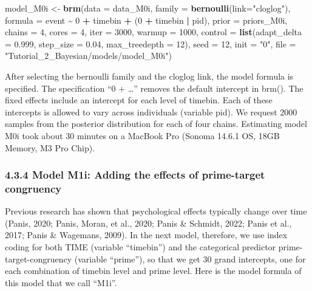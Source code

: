 \documentclass[
  man, donotrepeattitle,floatsintext]{apa6}
\newenvironment{Shaded}{\begin{snugshade}}{\end{snugshade}}
\newcommand{\AttributeTok}[1]{\textcolor[rgb]{0.13,0.29,0.53}{#1}}
\newcommand{\DecValTok}[1]{\textcolor[rgb]{0.00,0.00,0.81}{#1}}
\newcommand{\FloatTok}[1]{\textcolor[rgb]{0.00,0.00,0.81}{#1}}
\newcommand{\FunctionTok}[1]{\textcolor[rgb]{0.13,0.29,0.53}{\textbf{#1}}}
\newcommand{\NormalTok}[1]{#1}
\newcommand{\OtherTok}[1]{\textcolor[rgb]{0.56,0.35,0.01}{#1}}
\newcommand{\SpecialCharTok}[1]{\textcolor[rgb]{0.81,0.36,0.00}{\textbf{#1}}}
\newcommand{\StringTok}[1]{\textcolor[rgb]{0.31,0.60,0.02}{#1}}
\begin{document}
\begin{Shaded}
\begin{Highlighting}[]
\NormalTok{model\_M0i }\OtherTok{\textless{}{-}}                    
   \FunctionTok{brm}\NormalTok{(}\AttributeTok{data =}\NormalTok{ data\_M0i,}
       \AttributeTok{family =} \FunctionTok{bernoulli}\NormalTok{(}\AttributeTok{link=}\StringTok{"cloglog"}\NormalTok{),}
       \AttributeTok{formula =}\NormalTok{ event }\SpecialCharTok{\textasciitilde{}} \DecValTok{0} \SpecialCharTok{+}\NormalTok{ timebin }\SpecialCharTok{+}\NormalTok{ (}\DecValTok{0} \SpecialCharTok{+}\NormalTok{ timebin }\SpecialCharTok{|}\NormalTok{ pid),}
       \AttributeTok{prior =}\NormalTok{ priors\_M0i,}
       \AttributeTok{chains =} \DecValTok{4}\NormalTok{, }\AttributeTok{cores =} \DecValTok{4}\NormalTok{, }
       \AttributeTok{iter =} \DecValTok{3000}\NormalTok{, }\AttributeTok{warmup =} \DecValTok{1000}\NormalTok{,}
       \AttributeTok{control =} \FunctionTok{list}\NormalTok{(}\AttributeTok{adapt\_delta =} \FloatTok{0.999}\NormalTok{, }
                      \AttributeTok{step\_size =} \FloatTok{0.04}\NormalTok{, }
                      \AttributeTok{max\_treedepth =} \DecValTok{12}\NormalTok{),}
       \AttributeTok{seed =} \DecValTok{12}\NormalTok{, }\AttributeTok{init =} \StringTok{"0"}\NormalTok{,}
       \AttributeTok{file =} \StringTok{"Tutorial\_2\_Bayesian/models/model\_M0i"}\NormalTok{)}
\end{Highlighting}
\end{Shaded}

After selecting the bernoulli family and the cloglog link, the model formula is specified. The specification ``0 + \ldots{}'' removes the default intercept in brm(). The fixed effects include an intercept for each level of timebin. Each of these intercepts is allowed to vary across individuals (variable pid). We request 2000 samples from the posterior distribution for each of four chains. Estimating model M0i took about 30 minutes on a MacBook Pro (Sonoma 14.6.1 OS, 18GB Memory, M3 Pro Chip).

\subsubsection{4.3.4 Model M1i: Adding the effects of prime-target congruency}\label{model-m1i-adding-the-effects-of-prime-target-congruency}

Previous research has shown that psychological effects typically change over time (Panis, 2020; Panis, Moran, et al., 2020; Panis \& Schmidt, 2022; Panis et al., 2017; Panis \& Wagemans, 2009). In the next model, therefore, we use index coding for both TIME (variable ``timebin'') and the categorical predictor prime-target-congruency (variable ``prime''), so that we get 30 grand intercepts, one for each combination of timebin level and prime level. Here is the model formula of this model that we call ``M1i''.
\end{document}
